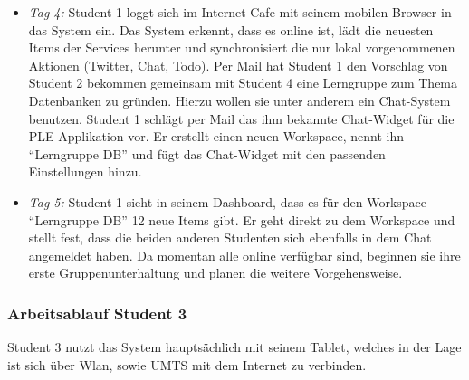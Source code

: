 \begin{itemize}
 \item \emph{Tag 4:} Student 1 loggt sich im Internet-Cafe mit seinem mobilen Browser in das System ein. Das System erkennt, dass es online ist, lädt die neuesten Items der Services herunter und synchronisiert die nur lokal vorgenommenen Aktionen (Twitter, Chat, Todo). Per Mail hat Student 1 den Vorschlag von Student 2 bekommen gemeinsam mit Student 4 eine Lerngruppe zum Thema Datenbanken zu gründen. Hierzu wollen sie unter anderem ein Chat-System benutzen. Student 1 schlägt per Mail das ihm bekannte Chat-Widget für die PLE-Applikation vor. Er erstellt einen neuen Workspace, nennt ihn “Lerngruppe DB” und fügt das Chat-Widget mit den passenden Einstellungen hinzu.
 \item \emph{Tag 5:} Student 1 sieht in seinem Dashboard, dass es für den Workspace “Lerngruppe DB” 12 neue Items gibt. Er geht direkt zu dem Workspace und stellt fest, dass die beiden anderen Studenten sich ebenfalls in dem Chat angemeldet haben. Da momentan alle online verfügbar sind, beginnen sie ihre erste Gruppenunterhaltung und planen die weitere Vorgehensweise.
\end{itemize}

\subsubsection{Arbeitsablauf Student 3}
Student 3 nutzt das System hauptsächlich mit seinem Tablet, welches in der Lage ist sich über Wlan, sowie UMTS mit dem Internet zu verbinden.

